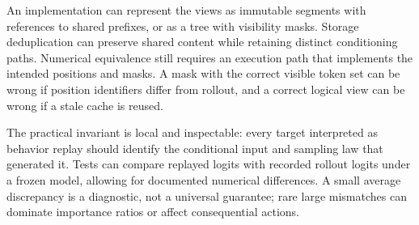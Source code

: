 An implementation can represent the views as immutable segments with references to shared prefixes, or as a tree with visibility masks. Storage deduplication can preserve shared content while retaining distinct conditioning paths. Numerical equivalence still requires an execution path that implements the intended positions and masks. A mask with the correct visible token set can be wrong if position identifiers differ from rollout, and a correct logical view can be wrong if a stale cache is reused.

The practical invariant is local and inspectable: every target interpreted as behavior replay should identify the conditional input and sampling law that generated it. Tests can compare replayed logits with recorded rollout logits under a frozen model, allowing for documented numerical differences. A small average discrepancy is a diagnostic, not a universal guarantee; rare large mismatches can dominate importance ratios or affect consequential actions.


